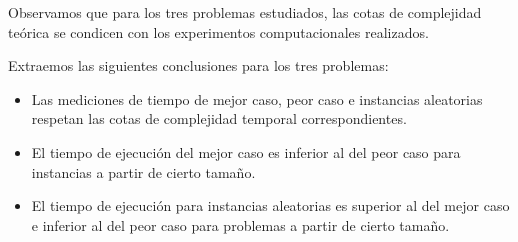 \documentclass[a4paper, 10pt, twoside]{article}
\begin{document}
Observamos que para los tres problemas estudiados, las cotas de complejidad teórica se condicen con los experimentos computacionales realizados.

Extraemos las siguientes conclusiones para los tres problemas:

\begin{itemize}
    \item{Las mediciones de tiempo de mejor caso, peor caso e instancias aleatorias respetan las cotas de complejidad temporal correspondientes.}
    \item{El tiempo de ejecución del mejor caso es inferior al del peor caso para instancias a partir de cierto tamaño.}
    \item{El tiempo de ejecución para instancias aleatorias es superior al del mejor caso e inferior al del peor caso para problemas a partir de cierto tamaño.}
\end{itemize}




\newpage
\end{document}
